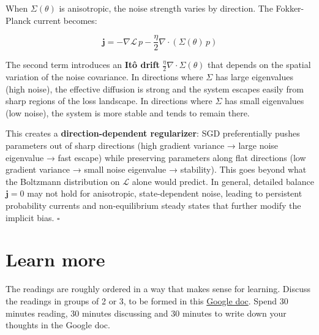 \documentclass[11pt]{article}
\begin{document}
\begin{solution}[ex:td-6c]
When \(\Sigma(\theta)\) is anisotropic, the noise strength
varies by direction. The Fokker-Planck current becomes:

\[\mathbf{j} = -\nabla\mathcal{L}\,p - \frac{\eta}{2}\nabla\cdot(\Sigma(\theta)\,p)\]

The second term introduces an \textbf{Itô drift}
\(\frac{\eta}{2}\nabla\cdot\Sigma(\theta)\) that depends on the spatial
variation of the noise covariance. In directions where \(\Sigma\) has
large eigenvalues (high noise), the effective diffusion is strong and
the system escapes easily from sharp regions of the loss landscape. In
directions where \(\Sigma\) has small eigenvalues (low noise), the
system is more stable and tends to remain there.

This creates a \textbf{direction-dependent regularizer}: SGD
preferentially pushes parameters out of sharp directions (high gradient
variance → large noise eigenvalue → fast escape) while preserving
parameters along flat directions (low gradient variance → small noise
eigenvalue → stability). This goes beyond what the Boltzmann
distribution on \(\mathcal{L}\) alone would predict. In general,
detailed balance \(\mathbf{j} = 0\) may not hold for anisotropic,
state-dependent noise, leading to persistent probability currents and
non-equilibrium steady states that further modify the implicit bias.
\(\square\)
\end{solution}

\section*{Learn more}

The readings are roughly ordered in a way that makes sense for learning. Discuss the readings in groups of 2 or 3, to be formed in this \href{https://docs.google.com/document/d/18ipUc3WcV2DOqHJRD_TqHAPyEaYHK0SVpUfiXtBF99Q/edit?tab=t.0}{Google doc}. Spend 30 minutes reading, 30 minutes discussing and 30 minutes to write down your thoughts in the Google doc.
\end{document}
